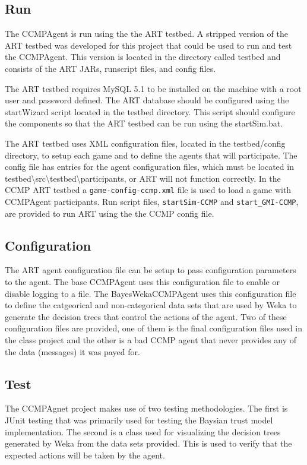 \subsection{Run}
The CCMPAgent is run using the the ART testbed.  A stripped version of the
ART testbed was developed for this project that could be used to run and test
the CCMPAgent.  This version is located in the directory called testbed and
consists of the ART JARs, runscript files, and config files.  

The ART testbed requires MySQL 5.1 to be installed on the machine with a root
user and password defined.  The ART database should be configured using the
startWizard script located in the testbed directory.  This script should
configure the components so that the ART testbed can be run using the
startSim.bat.

The ART testbed uses XML configuration files, located in the testbed/config
directory, to setup each game and to define the agents that will participate. The
config file has entries for the agent configuration files, which must be located
in testbed\textbackslash src\textbackslash testbed\textbackslash participants, or
ART will not function correctly.  In the CCMP ART testbed a
\verb+game-config-ccmp.xml+ file is used to load a game with CCMPAgent
participants.  Run script files, \verb+startSim-CCMP+ and \verb+start_GMI-CCMP+,
are provided to run ART using the the CCMP config file.

\subsection{Configuration}
The ART agent configuration file can be setup to pass configuration parameters
to the agent.  The base CCMPAgent uses this configuration file to enable or
disable logging to a file.  The BayesWekaCCMPAgent uses this configuration file
to define the catgeorical and non-categorical data sets that are used by Weka
to generate the decision trees that control the actions of the agent.  Two of
these configuration files are provided, one of them is the final configuration
files used in the class project and the other is a bad CCMP agent that never
provides any of the data (messages) it was payed for.

\subsection{Test}
The CCMPAgnet project makes use of two testing methodologies.  The first is
JUnit testing that was primarily used for testing the Baysian trust model
implementation.  The second is a class used for visualizing the decision trees
generated by Weka from the data sets provided.  This is used to verify that the
expected actions will be taken by the agent.

